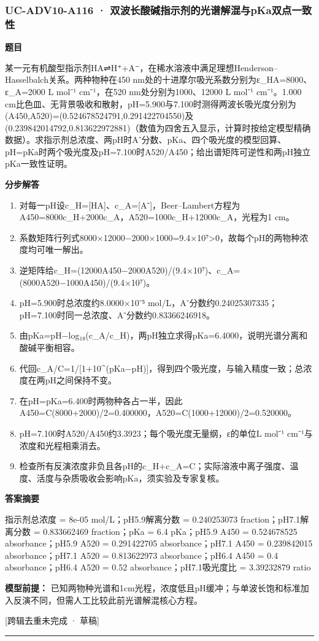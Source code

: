 \documentclass[UTF8,11pt,a4paper]{ctexart}
\begin{document}
\subsubsection*{UC-ADV10-A116 · 双波长酸碱指示剂的光谱解混与pKa双点一致性}
\noindent\textbf{题目}\par
某一元有机酸型指示剂HA⇌H⁺+A⁻，在稀水溶液中满足理想Henderson–Hasselbalch关系。两种物种在450 nm处的十进摩尔吸光系数分别为ε\_HA=8000、ε\_A=2000 L mol⁻¹ cm⁻¹，在520 nm处分别为1000、12000 L mol⁻¹ cm⁻¹。1.000 cm比色皿、无背景吸收和散射，pH=5.900与7.100时测得两波长吸光度分别为(A450,A520)=(0.524678524791,0.291422704550)及(0.239842014792,0.813622972881)（数值为四舍五入显示，计算时按给定模型精确数据）。求指示剂总浓度、两pH时A⁻分数、pKa、四个吸光度的模型回算、pH=pKa时两个吸光度及pH=7.100时A520/A450；给出谱矩阵可逆性和两pH独立pKa一致性证明。\par
\medskip\noindent\textbf{分步解答}
\begin{enumerate}
\item 对每一pH设c\_H=[HA]、c\_A=[A⁻]，Beer–Lambert方程为A450=8000c\_H+2000c\_A，A520=1000c\_H+12000c\_A，光程为1 cm。
\item 系数矩阵行列式8000×12000−2000×1000=9.4×10⁷>0，故每个pH的两物种浓度均可唯一解出。
\item 逆矩阵给c\_H=(12000A450−2000A520)/(9.4×10⁷)、c\_A=(8000A520−1000A450)/(9.4×10⁷)。
\item pH=5.900时总浓度约8.0000×10⁻⁵ mol/L，A⁻分数约0.24025307335；pH=7.100时同一总浓度、A⁻分数约0.83366246918。
\item 由pKa=pH−log₁₀(c\_A/c\_H)，两pH独立求得pKa=6.4000，说明光谱分离和酸碱平衡相容。
\item 代回c\_A/C=1/[1+10\textasciicircum{}(pKa−pH)]，得到四个吸光度，与输入精度一致；总浓度在两pH之间保持不变。
\item 在pH=pKa=6.400时两物种各占一半，因此A450=C(8000+2000)/2=0.400000，A520=C(1000+12000)/2=0.520000。
\item pH=7.100时A520/A450约3.3923；每个吸光度无量纲，ε的单位L mol⁻¹ cm⁻¹与浓度和光程相乘消去。
\item 检查所有反演浓度非负且各pH的c\_H+c\_A=C；实际溶液中离子强度、温度、活度与杂质吸收会影响pKa，须实验及专家复核。
\end{enumerate}
\noindent\textbf{答案摘要}\par
指示剂总浓度 = 8e-05 mol/L；pH5.9解离分数 = 0.240253073 fraction；pH7.1解离分数 = 0.833662469 fraction；pKa = 6.4 pKa；pH5.9 A450 = 0.524678525 absorbance；pH5.9 A520 = 0.291422705 absorbance；pH7.1 A450 = 0.239842015 absorbance；pH7.1 A520 = 0.813622973 absorbance；pH6.4 A450 = 0.4 absorbance；pH6.4 A520 = 0.52 absorbance；pH7.1吸光度比 = 3.39232879 ratio\par
\noindent\textbf{模型前提：}
已知两物种光谱和1cm光程，浓度低且pH缓冲；与单波长饱和标准加入反演不同，但需人工比较此前光谱解混核心方程。\par
\noindent\textcolor{red!65!black}{[跨辑去重未完成 · 草稿]} \par
\medskip\hrule\medskip
{}
\end{document}
